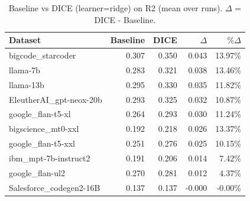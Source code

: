 \begin{table}[t]
\centering
\small
\caption{Baseline vs DICE (learner=ridge) on R2 (mean over runs). $\Delta$ = DICE - Baseline.}
\label{tab:baseline-vs-dice-ridge-R2}
\begin{tabular}{lrrrr}
\toprule
Dataset & Baseline & DICE & $\Delta$ & $\%\Delta$ \\
\midrule
bigcode\_starcoder & 0.307 & 0.350 & 0.043 & 13.97\% \\
llama-7b & 0.283 & 0.321 & 0.038 & 13.46\% \\
llama-13b & 0.295 & 0.330 & 0.035 & 11.82\% \\
EleutherAI\_gpt-neox-20b & 0.293 & 0.325 & 0.032 & 10.87\% \\
google\_flan-t5-xl & 0.264 & 0.293 & 0.030 & 11.24\% \\
bigscience\_mt0-xxl & 0.192 & 0.218 & 0.026 & 13.37\% \\
google\_flan-t5-xxl & 0.251 & 0.276 & 0.025 & 10.15\% \\
ibm\_mpt-7b-instruct2 & 0.191 & 0.206 & 0.014 & 7.42\% \\
google\_flan-ul2 & 0.270 & 0.281 & 0.012 & 4.37\% \\
Salesforce\_codegen2-16B & 0.137 & 0.137 & -0.000 & -0.00\% \\
\bottomrule
\end{tabular}
\end{table}